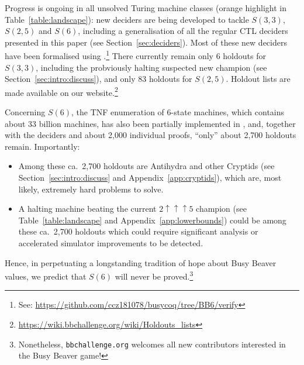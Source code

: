 \documentclass[a4paper,british]{article}
\theoremstyle{definition} %
\numberwithin{equation}{section}
\theoremstyle{definition} %
\newcommand{\rado}{Rad\'o\xspace}
\begin{document}
Progress is ongoing in all unsolved Turing machine classes (orange highlight in Table~\ref{table:landscape}): new deciders are being developed to tackle $S(3,3)$, $S(2,5)$ and $S(6)$, including a generalisation of all the regular CTL deciders presented in this paper (see Section~\ref{sec:deciders}). Most of these new deciders have been formalised using \Coq.\footnote{See: \url{https://github.com/ccz181078/busycoq/tree/BB6/verify}} There currently remain only $6$ holdouts for $S(3,3)$, including the probviously halting suspected new champion (see Section~\ref{sec:intro:discuss}), and only $83$ holdouts for $S(2,5)$. Holdout lists are made available on our website.\footnote{\url{https://wiki.bbchallenge.org/wiki/Holdouts_lists}}

Concerning $S(6)$, the TNF enumeration of 6-state machines, which contains about 33 billion machines, has also been partially implemented in \Coq, and, together with the deciders and about 2,000 individual proofs, ``only'' about 2,700 holdouts remain. Importantly:
\begin{itemize}[label=--]
    \item Among these ca.~2,700 holdouts are Antihydra and other Cryptids (see Section~\ref{sec:intro:discuss} and Appendix~\ref{app:cryptids}), which are, most likely, extremely hard problems to solve.
    \item A halting machine beating the current $2\uparrow\uparrow\uparrow5$ champion (see Table~\ref{table:landscape} and Appendix~\ref{app:lowerbounds}) could be among these ca.~2,700 holdouts which could require significant analysis or accelerated simulator improvements to be detected.
\end{itemize}


Hence, in perpetuating a longstanding tradition of hope about Busy Beaver values, we predict that $S(6)$ will never be proved.\footnote{Nonetheless, \texttt{bbchallenge.org} welcomes all new contributors interested in the Busy Beaver game!}

\end{document}
